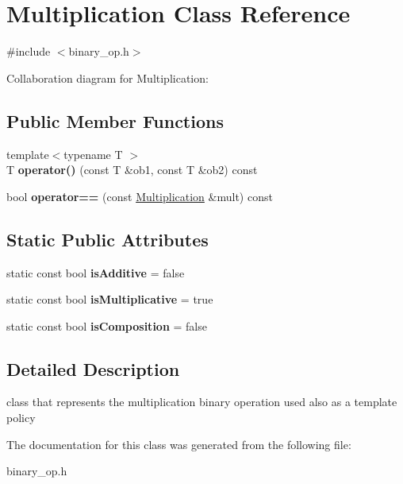 \hypertarget{classMultiplication}{\section{Multiplication Class Reference}
\label{classMultiplication}
}


{\ttfamily \#include $<$binary\-\_\-op.\-h$>$}



Collaboration diagram for Multiplication\-:
\subsection*{Public Member Functions}
\begin{DoxyCompactItemize}
\item 
\hypertarget{classMultiplication_abc832d7341a7f4a33054e41b8a6883da}{{\footnotesize template$<$typename T $>$ }\\T {\bfseries operator()} (const T \&ob1, const T \&ob2) const }\label{classMultiplication_abc832d7341a7f4a33054e41b8a6883da}

\item 
\hypertarget{classMultiplication_a47a134df1cf1d2a544b875b981682568}{bool {\bfseries operator==} (const \hyperlink{classMultiplication}{Multiplication} \&mult) const }\label{classMultiplication_a47a134df1cf1d2a544b875b981682568}

\end{DoxyCompactItemize}
\subsection*{Static Public Attributes}
\begin{DoxyCompactItemize}
\item 
\hypertarget{classMultiplication_a37f52c627c1caa3a1ba0388de58c5dbd}{static const bool {\bfseries is\-Additive} = false}\label{classMultiplication_a37f52c627c1caa3a1ba0388de58c5dbd}

\item 
\hypertarget{classMultiplication_aaf72f7c6c05f7ed984c8e997e0505d60}{static const bool {\bfseries is\-Multiplicative} = true}\label{classMultiplication_aaf72f7c6c05f7ed984c8e997e0505d60}

\item 
\hypertarget{classMultiplication_adbcbdd5feb18d22c1765fbe1b7829840}{static const bool {\bfseries is\-Composition} = false}\label{classMultiplication_adbcbdd5feb18d22c1765fbe1b7829840}

\end{DoxyCompactItemize}


\subsection{Detailed Description}
class that represents the multiplication binary operation used also as a template policy 

The documentation for this class was generated from the following file\-:\begin{DoxyCompactItemize}
\item 
binary\-\_\-op.\-h\end{DoxyCompactItemize}
